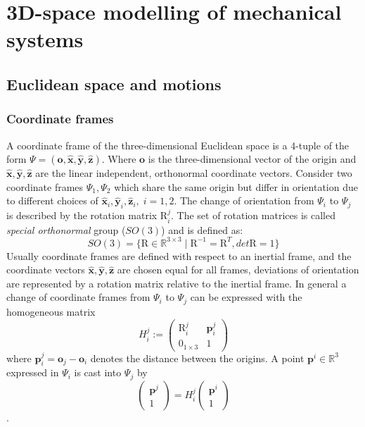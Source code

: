 \documentclass[a4paper,twoside, openright,12pt]{report}
\newcommand{\f}[1]{\boldsymbol{#1}}
\newcommand{\g}[1]{\text{#1}}
\begin{document}
\section{3D-space modelling of mechanical systems}\label{S:3Dspace-modelling}


\subsection{Euclidean space and motions}\label{[SS:euclideanspacemotions]}
\subsubsection{Coordinate frames}
A coordinate frame of the three-dimensional Euclidean space is a 4-tuple of the form $ \Psi = (\f{o},\hat{\f{x}},\hat{\f{y}},\hat{\f{z}})$. Where $ \f{o} $ is the three-dimensional vector of the origin and $ \hat{\f{x}},\hat{\f{y}},\hat{\f{z}} $ are the linear independent, orthonormal coordinate vectors. Consider two coordinate frames $ {\Psi}_1,{\Psi}_2 $ which share the same origin but differ in orientation due to different choices of $ \hat{\f{x}}_i,\hat{\f{y}}_i,\hat{\f{z}}_i, \; i=1,2 $. The change of orientation from $ {\Psi}_i $ to $ {\Psi}_j $ is described by the rotation matrix $ \g{R}_i^j $. The set of rotation matrices is called \emph{special orthonormal} group ($SO(3)$) \cite{Stramigioli_01b} and is defined as:
\begin{equation}
	SO(3) = \{\g{R} \in \mathbb{R}^{3 \times 3} \; | \; \g{R}^{-1} = \g{R}^T, det \g{R} = 1\}
\end{equation}
Usually coordinate frames are defined with respect to an inertial frame, and the coordinate vectors $ \hat{\f{x}},\hat{\f{y}},\hat{\f{z}} $ are chosen equal for all frames, deviations of orientation are represented by a rotation matrix relative to the inertial frame. In general a change of coordinate frames from $ \Psi_i $ to $ \Psi_j $ can be expressed with the homogeneous matrix
\[ H_i^j := \begin{pmatrix}\g{R}_i^j & \f{p}_i^j \\ 0_{1\times3} & 1\end{pmatrix} \]
where $\f{p}_i^j = \f{o}_j - \f{o}_i$ denotes the distance between the origins. A point $ \f{p}^i \in \mathbb{R}^3 $ expressed in $ {\Psi}_i $ is cast into ${\Psi}_j$ by
\begin{equation}\label{EQ:coordchange}
	\begin{pmatrix}\f{p}^j \\ 1\end{pmatrix} = H_i^j \begin{pmatrix}
		\f{p}^i \\ 1\end{pmatrix}
\end{equation}.
\end{document}
